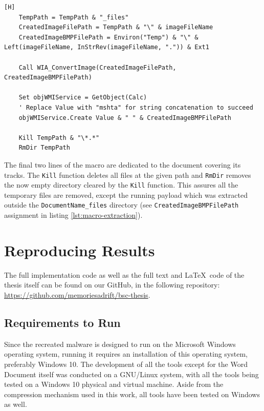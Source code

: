 \begin{lstlisting}[language=VBScript, label={lst:macro-extraction}, 
caption={The meat of the macro -- extracting the payload from the converted image and executing it.}][H]
    TempPath = TempPath & "_files"
    CreatedImageFilePath = TempPath & "\" & imageFileName
    CreatedImageBMPFilePath = Environ("Temp") & "\" & Left(imageFileName, InStrRev(imageFileName, ".")) & Ext1

    Call WIA_ConvertImage(CreatedImageFilePath, CreatedImageBMPFilePath)

    Set objWMIService = GetObject(Calc)
    ' Replace Value with "mshta" for string concatenation to succeed
    objWMIService.Create Value & " " & CreatedImageBMPFilePath

    Kill TempPath & "\*.*"
    RmDir TempPath
\end{lstlisting}

The final two lines of the macro are dedicated to the document covering its tracks. The \verb+Kill+ function deletes all
files at the given path and \verb+RmDir+ removes the now empty directory cleared by the \verb+Kill+ function. This
assures all the temporary files are removed, except the running payload which was extracted outside the \verb+DocumentName_files+
directory (see \verb+CreatedImageBMPFilePath+ assignment in listing \ref{lst:macro-extraction}).

\section{Reproducing Results}\label{sec:reproducing-results}
The full implementation code as well as the full text and \LaTeX\ code of the thesis itself can be found 
on our GitHub, in the following repository: \url{https://github.com/memoriesadrift/bsc-thesis}.

\subsection{Requirements to Run}
Since the recreated malware is designed to run on the Microsoft Windows operating system, running it requires
an installation of this operating system, preferably Windows 10. %
The development of all the tools except for the Word Document itself was conducted on a GNU/Linux system, with all
the tools being tested on a Windows 10 physical and virtual machine. Aside from the compression mechanism used in this
work, all tools have been tested on Windows as well.

